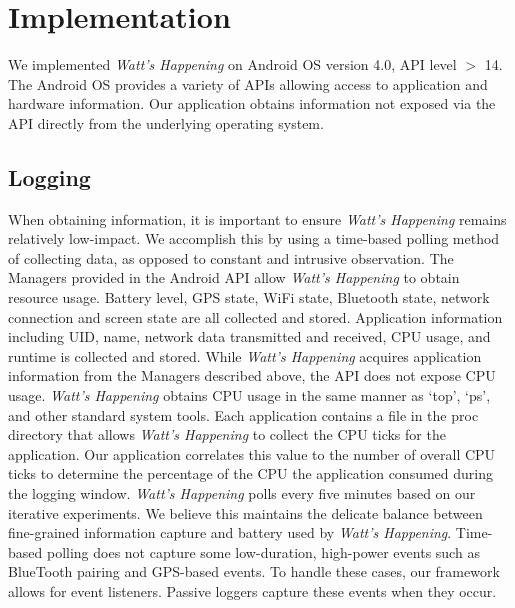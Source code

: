 \section{Implementation}
\label{sec:implementation}
We implemented \emph{Watt's Happening} on Android OS version 4.0, API level $>$ 14. 
The Android OS provides a variety of APIs allowing access to application and hardware information.
Our application obtains information not exposed via the API directly from the underlying operating system.

\subsection{Logging}
\label{subsec:impl_logging}
When obtaining information, it is important to ensure \emph{Watt's Happening} remains relatively low-impact.
We accomplish this by using a time-based polling method of collecting data, as opposed to constant and intrusive observation.
The Managers provided in the Android API allow \emph{Watt's Happening} to obtain resource usage.
Battery level, GPS state, WiFi state, Bluetooth state, network connection and screen state are all collected and stored.
Application information including UID, name, network data transmitted and received, CPU usage, and runtime is collected and stored. 
%
While \emph{Watt's Happening} acquires application information from the Managers described above, the API does not expose CPU usage.
\emph{Watt's Happening} obtains CPU usage in the same manner as `top', `ps', and other standard system tools.
Each application contains a file in the proc directory that allows \emph{Watt's Happening} to collect the CPU ticks for the application.
%
Our application correlates this value to the number of overall CPU ticks to determine the percentage of the CPU the application consumed during the logging window.
\emph{Watt's Happening} polls every five minutes based on our iterative experiments.
We believe this maintains the delicate balance between fine-grained information capture and battery used by \emph{Watt's Happening}.
Time-based polling does not capture some low-duration, high-power events such as BlueTooth pairing and GPS-based events.
To handle these cases, our framework allows for event listeners.
Passive loggers capture these events when they occur.

